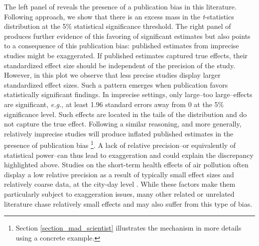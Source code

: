 \documentclass[12pt]{article}
\begin{document}
    The left panel of  reveals the presence of a publication bias in this literature. Following \cite{brodeur_star_2016, brodeur_methods_2020} approach, we show that there is an excess mass in the \textit{t}-statistics distribution at the 5\% statistical significance threshold. The right panel of  produces further evidence of this favoring of significant estimates but also  points to a consequence of this publication bias: published estimates from imprecise studies might be exaggerated. If published estimates captured true effects, their standardized effect size should be independent of the precision of the study. However, in this plot we observe that less precise studies display larger standardized effect sizes. Such a pattern emerges when publication favors statistically significant findings. In imprecise settings, only large--too large--effects are significant, \textit{e.g.}, at least 1.96 standard errors away from 0 at the 5\% significance level. Such effects are located in the tails of the distribution and do not capture the true effect. Following a similar reasoning, and more generally, relatively imprecise studies will produce inflated published estimates in the presence of publication bias \citep{ioannidis_why_2008, gelman_beyond_2014}\footnote{Section \ref{section_mad_scientist} illustrates the mechanism in more details using a concrete example.}. 
    A lack of relative precision--or equivalently of statistical power--can thus lead to exaggeration and could explain the discrepancy highlighted above. Studies on the short-term health effects of air pollution often display a low relative precision as a result of typically small effect sizes and relatively coarse data, at the city-day level \citep{peng2006model, peng2008statistical}. While these factors make them particularly subject to exaggeration issues, many other related or unrelated literature chase relatively small effects and may also suffer from this type of bias. 
\end{document}
